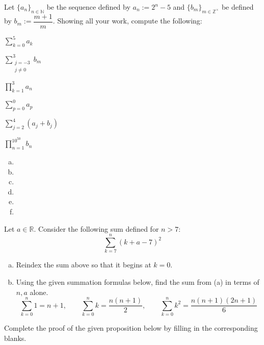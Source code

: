 \documentclass[11pt,letterpaper]{article}
\begin{document}

 Let $\{ a_n \}_{n \in \mathbb{N}}$ be the sequence defined by $a_n:= 2^n - 5$ and $\{ b_m \}_{m \in \mathbb{Z}^\times}$ be defined by $b_m:= \dfrac{m + 1}{m}$. Showing all your work, compute the following:
	\begin{2enumerate}
	\item $\displaystyle \sum_{k= 0}^5 a_k$
	\item $\displaystyle \sum_{\substack{j= -3 \\ j \neq 0}}^3 b_m$
	\item $\displaystyle \prod_{k= 1}^3 a_n$
	\item $\displaystyle \sum_{p=0}^0 a_p$
	\item $\displaystyle \sum_{j=2}^4 (a_j + b_j)$
	\item $\displaystyle \prod_{n=1}^{10^{50}} b_n$
	\end{2enumerate} \pspace

\sol 
\begin{enumerate}[(a)]
\item 
\item 
\item 
\item 
\item 
\item 
\end{enumerate}



\newpage



 Let $a \in \mathbb{R}$. Consider the following sum defined for $n > 7$:
	\[
	\sum_{k=7}^n \left(k + a - 7 \right)^2
	\]

\begin{enumerate}[(a)]
\item Reindex the sum above so that it begins at $k= 0$. 
\item Using the given summation formulas below, find the sum from (a) in terms of $n, a$ alone. 
	\[
	\sum_{k=0}^n 1= n + 1, \qquad \sum_{k=0}^n k= \dfrac{n (n + 1)}{2}, \qquad \sum_{k=0}^n k^2= \dfrac{n (n + 1)(2n + 1)}{6}
	\]
\end{enumerate}



\newpage



 Complete the proof of the given proposition below by filling in the corresponding blanks. \pspace
\end{document}
